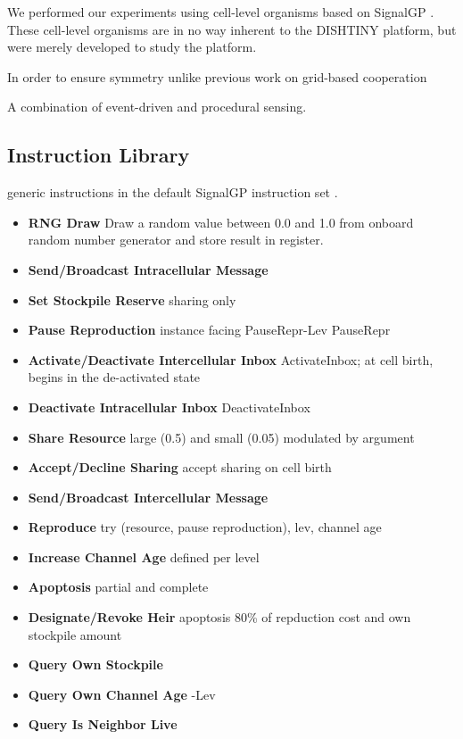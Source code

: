 We performed our experiments using cell-level organisms based on SignalGP \cite{lalejini2018evolving}.
These cell-level organisms are in no way inherent to the DISHTINY platform, but were merely developed to study the platform.

In order to ensure symmetry
unlike previous work on grid-based cooperation

A combination of event-driven and procedural sensing.

\subsection{Instruction Library}

generic instructions in the default SignalGP instruction set \cite{lalejini2018evolving}.

\begin{itemize}
\item \textbf{RNG Draw} Draw a random value between 0.0 and 1.0 from onboard random number generator and store result in register.
\item \textbf{Send/Broadcast Intracellular Message}
\item \textbf{Set Stockpile Reserve} sharing only
\item \textbf{Pause Reproduction} instance facing PauseRepr-Lev PauseRepr
\item \textbf{Activate/Deactivate Intercellular Inbox} ActivateInbox; at cell birth, begins in the de-activated state
\item \textbf{Deactivate Intracellular Inbox}  DeactivateInbox
\item \textbf{Share Resource} large (0.5) and small (0.05) modulated by argument
\item \textbf{Accept/Decline Sharing} accept sharing on cell birth
\item \textbf{Send/Broadcast Intercellular Message}
\item \textbf{Reproduce} try (resource, pause reproduction), lev, channel age
\item \textbf{Increase Channel Age} defined per level
\item \textbf{Apoptosis} partial and complete
\item \textbf{Designate/Revoke Heir} apoptosis 80\% of repduction cost and own stockpile amount
\item \textbf{Query Own Stockpile}
\item \textbf{Query Own Channel Age} -Lev
\item \textbf{Query Is Neighbor Live}

\end{itemize}
